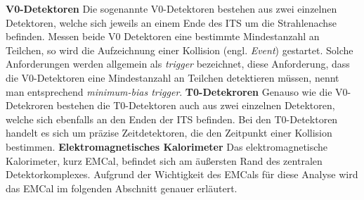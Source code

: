 \newline
\textbf{V0-Detektoren}
\newline
Die sogenannte V0-Detektoren bestehen aus zwei einzelnen Detektoren, welche sich jeweils an einem Ende des ITS um die Strahlenachse befinden.
Messen beide V0 Detektoren eine bestimmte Mindestanzahl an Teilchen, so wird die Aufzeichnung einer Kollision (engl. \textit{Event}) gestartet.
Solche Anforderungen werden allgemein als \textit{trigger} bezeichnet, diese Anforderung, dass die V0-Detektoren eine Mindestanzahl an Teilchen detektieren m\"ussen, nennt man entsprechend \textit{minimum-bias trigger}.
\newline
\textbf{T0-Detekroren}
\newline
Genauso wie die V0-Detekroren bestehen die T0-Detektoren auch aus zwei einzelnen Detektoren, welche sich ebenfalls an den Enden der ITS befinden.
Bei den T0-Detektoren handelt es sich um pr\"azise Zeitdetektoren, die den Zeitpunkt einer Kollision bestimmen.
\newline
\textbf{Elektromagnetisches Kalorimeter}
\newline
Das elektromagnetische Kalorimeter, kurz EMCal, befindet sich am \"au{\ss}ersten Rand des zentralen Detektorkomplexes.
Aufgrund der Wichtigkeit des EMCals f\"ur diese Analyse wird das EMCal im folgenden Abschnitt genauer erl\"autert.
